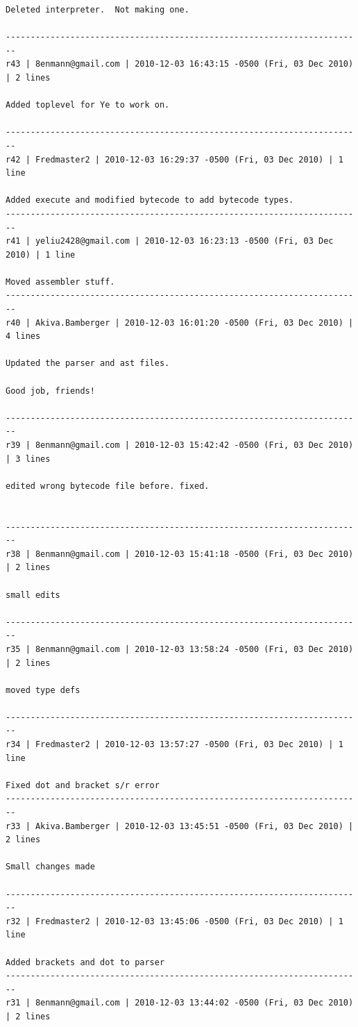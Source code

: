 \documentclass[12pt,A4]{book}
\begin{document}
\begin{verbatim}
Deleted interpreter.  Not making one. 

------------------------------------------------------------------------
r43 | 8enmann@gmail.com | 2010-12-03 16:43:15 -0500 (Fri, 03 Dec 2010) | 2 lines

Added toplevel for Ye to work on.

------------------------------------------------------------------------
r42 | Fredmaster2 | 2010-12-03 16:29:37 -0500 (Fri, 03 Dec 2010) | 1 line

Added execute and modified bytecode to add bytecode types.
------------------------------------------------------------------------
r41 | yeliu2428@gmail.com | 2010-12-03 16:23:13 -0500 (Fri, 03 Dec 2010) | 1 line

Moved assembler stuff.
------------------------------------------------------------------------
r40 | Akiva.Bamberger | 2010-12-03 16:01:20 -0500 (Fri, 03 Dec 2010) | 4 lines

Updated the parser and ast files.

Good job, friends!

------------------------------------------------------------------------
r39 | 8enmann@gmail.com | 2010-12-03 15:42:42 -0500 (Fri, 03 Dec 2010) | 3 lines

edited wrong bytecode file before. fixed.


------------------------------------------------------------------------
r38 | 8enmann@gmail.com | 2010-12-03 15:41:18 -0500 (Fri, 03 Dec 2010) | 2 lines

small edits

------------------------------------------------------------------------
r35 | 8enmann@gmail.com | 2010-12-03 13:58:24 -0500 (Fri, 03 Dec 2010) | 2 lines

moved type defs

------------------------------------------------------------------------
r34 | Fredmaster2 | 2010-12-03 13:57:27 -0500 (Fri, 03 Dec 2010) | 1 line

Fixed dot and bracket s/r error
------------------------------------------------------------------------
r33 | Akiva.Bamberger | 2010-12-03 13:45:51 -0500 (Fri, 03 Dec 2010) | 2 lines

Small changes made

------------------------------------------------------------------------
r32 | Fredmaster2 | 2010-12-03 13:45:06 -0500 (Fri, 03 Dec 2010) | 1 line

Added brackets and dot to parser
------------------------------------------------------------------------
r31 | 8enmann@gmail.com | 2010-12-03 13:44:02 -0500 (Fri, 03 Dec 2010) | 2 lines


\end{verbatim}
\end{document}
